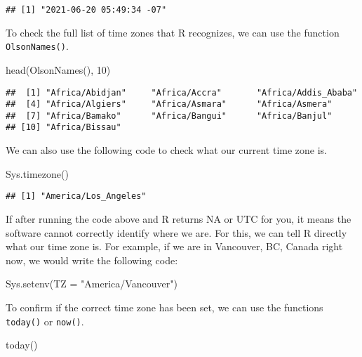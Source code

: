 \documentclass[
]{book}
\newenvironment{Shaded}{\begin{snugshade}}{\end{snugshade}}
\newcommand{\AttributeTok}[1]{\textcolor[rgb]{0.77,0.63,0.00}{#1}}
\newcommand{\DecValTok}[1]{\textcolor[rgb]{0.00,0.00,0.81}{#1}}
\newcommand{\FunctionTok}[1]{\textcolor[rgb]{0.00,0.00,0.00}{#1}}
\newcommand{\NormalTok}[1]{#1}
\newcommand{\StringTok}[1]{\textcolor[rgb]{0.31,0.60,0.02}{#1}}
\begin{document}
\begin{verbatim}
## [1] "2021-06-20 05:49:34 -07"
\end{verbatim}

To check the full list of time zones that R recognizes, we can use the function \texttt{OlsonNames()}.

\begin{Shaded}
\begin{Highlighting}[]
\FunctionTok{head}\NormalTok{(}\FunctionTok{OlsonNames}\NormalTok{(), }\DecValTok{10}\NormalTok{)}
\end{Highlighting}
\end{Shaded}

\begin{verbatim}
##  [1] "Africa/Abidjan"     "Africa/Accra"       "Africa/Addis_Ababa"
##  [4] "Africa/Algiers"     "Africa/Asmara"      "Africa/Asmera"     
##  [7] "Africa/Bamako"      "Africa/Bangui"      "Africa/Banjul"     
## [10] "Africa/Bissau"
\end{verbatim}

We can also use the following code to check what our current time zone is.

\begin{Shaded}
\begin{Highlighting}[]
\FunctionTok{Sys.timezone}\NormalTok{()}
\end{Highlighting}
\end{Shaded}

\begin{verbatim}
## [1] "America/Los_Angeles"
\end{verbatim}

If after running the code above and R returns NA or UTC for you, it means the software cannot correctly identify where we are. For this, we can tell R directly what our time zone is. For example, if we are in Vancouver, BC, Canada right now, we would write the following code:

\begin{Shaded}
\begin{Highlighting}[]
\FunctionTok{Sys.setenv}\NormalTok{(}\AttributeTok{TZ =} \StringTok{"America/Vancouver"}\NormalTok{)}
\end{Highlighting}
\end{Shaded}

To confirm if the correct time zone has been set, we can use the functions \texttt{today()} or \texttt{now()}.

\begin{Shaded}
\begin{Highlighting}[]
\FunctionTok{today}\NormalTok{()}
\end{Highlighting}
\end{Shaded}
\end{document}
